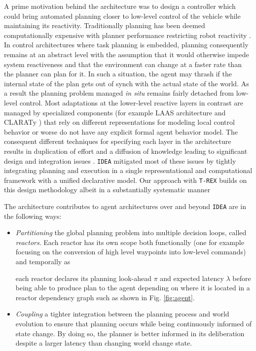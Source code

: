 A prime motivation behind the \rx architecture was to design a
controller which could bring automated planning closer to low-level
control of the vehicle while maintaining its reactivity. Traditionally
planning has been deemed computationally expensive with planner
performance restricting robot reactivity
\cite{ghallab04,Dias:2003ua}. In control architectures where task
planning is embedded, planning consequently remains at an abstract
level with the assumption that it would otherwise impede system
reactiveness and that the environment can change at a faster rate than
the planner can plan for it. In such a situation, the agent may thrash
if the internal state of the plan gets out of synch with the actual
state of the world. As a result the planning problem managed {\em in
  situ} remains fairly detached from low-level control. Most
adaptations at the lower-level reactive layers in contrast are managed
by specialized components (for example LAAS architecture
\cite{alami:1998p820,Ingrand07} and CLARATy \cite{Nesnas:2003do}
) that rely on different representations for modeling local
control behavior or worse do not have any explicit formal agent
behavior model. The consequent different techniques for specifying
each layer in the architecture results in duplication of effort and a
diffusion of knowledge leading to significant design and integration
issues \cite{DS1report}.  \texttt{IDEA} mitigated most of these issues
by tightly integrating planning and execution in a single
representational and computational framework with a unified
declarative model. Our approach with \texttt{T-REX} builds on this
design methodology albeit in a substantially systematic manner

The \rx architecture contributes to agent architectures over and
beyond \texttt{IDEA} are in the following ways:

\begin{itemize}

\item \emph{Partitioning} the global planning problem into multiple
  decision loops, called {\em reactors}. Each reactor has its own
  scope both functionally (one for example focusing on the conversion
  of high level waypoints into low-level commands) and temporally as

  each reactor declares its planning look-ahead $\pi$ and expected
  latency $\lambda$
  before being able to produce plan to the agent depending on where it
  is located in a reactor dependency graph such as shown in
  Fig. \ref{fig:agent}.

\item \emph{Coupling} a tighter integration between the planning
  process and world evolution to ensure that planning occurs while
  being continuously informed of state change. By doing so, the
  planner is better informed in its deliberation despite a larger
  latency than changing world change state.

\end{itemize}

